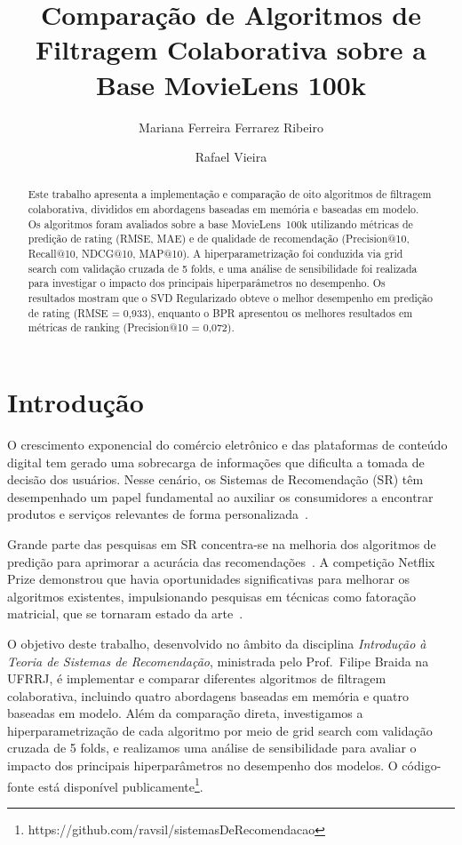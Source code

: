 \documentclass[sigconf,nonacm]{acmart}
\title{Comparação de Algoritmos de Filtragem Colaborativa sobre a Base MovieLens 100k}
\author{Mariana Ferreira Ferrarez Ribeiro}
\affiliation{
  \institution{Universidade Federal Rural do Rio de Janeiro}
  \department{Curso: Ciência da Computação}
}
\author{Rafael Vieira}
\affiliation{
  \institution{Universidade Federal Rural do Rio de Janeiro}
  \department{Curso: Ciência da Computação}
}
\begin{document}
\begin{abstract}
Este trabalho apresenta a implementação e comparação de oito algoritmos de
filtragem colaborativa, divididos em abordagens baseadas em memória e baseadas
em modelo. Os algoritmos foram avaliados sobre a base MovieLens~100k utilizando
métricas de predição de rating (RMSE, MAE) e de qualidade de recomendação
(Precision@10, Recall@10, NDCG@10, MAP@10). A hiperparametrização foi
conduzida via grid search com validação cruzada de 5 folds, e uma análise
de sensibilidade foi realizada para investigar o impacto dos principais
hiperparâmetros no desempenho. Os resultados mostram que o SVD Regularizado
obteve o melhor desempenho em predição de rating (RMSE = 0,933), enquanto o
BPR apresentou os melhores resultados em métricas de ranking
(Precision@10 = 0,072).
\end{abstract}

\maketitle

\section{Introdução}

O crescimento exponencial do comércio eletrônico e das plataformas de conteúdo
digital tem gerado uma sobrecarga de informações que dificulta a tomada de
decisão dos usuários. Nesse cenário, os Sistemas de Recomendação (SR) têm
desempenhado um papel fundamental ao auxiliar os consumidores a encontrar
produtos e serviços relevantes de forma personalizada~\cite{adomavicius2005}.

Grande parte das pesquisas em SR concentra-se na melhoria dos algoritmos de
predição para aprimorar a acurácia das recomendações~\cite{ricci2011}. A
competição Netflix Prize demonstrou que havia oportunidades significativas para
melhorar os algoritmos existentes, impulsionando pesquisas em técnicas como
fatoração matricial, que se tornaram estado da arte~\cite{koren2009}.

O objetivo deste trabalho, desenvolvido no âmbito da disciplina
\emph{Introdução à Teoria de Sistemas de Recomendação}, ministrada pelo
Prof.\ Filipe Braida na UFRRJ, é implementar e comparar diferentes algoritmos
de filtragem colaborativa, incluindo quatro abordagens baseadas em memória e
quatro baseadas em modelo. Além da comparação direta, investigamos a
hiperparametrização de cada algoritmo por meio de grid search com validação
cruzada de 5 folds, e realizamos uma análise de sensibilidade para avaliar o
impacto dos principais hiperparâmetros no desempenho dos modelos. O
código-fonte está disponível publicamente\footnote{https://github.com/ravsil/sistemasDeRecomendacao}.
\end{document}
